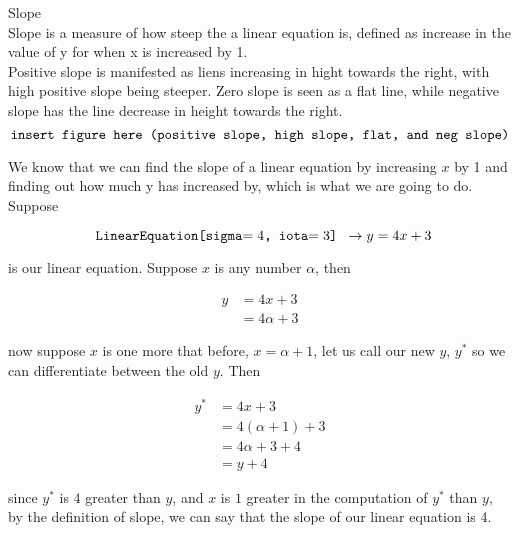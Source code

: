 \documentclass{book}
\begin{document}
  {\remark Slope \\
    Slope is a measure of how steep the a linear equation is, defined as increase in the value of y for when x is increased by 1.\\

    Positive slope is manifested as liens increasing in hight towards the right, with high positive slope being steeper. Zero slope is seen as a flat line, while negative slope has the line decrease in height towards the right.\\

    $$\text{\texttt{insert figure here (positive slope, high slope, flat, and neg slope)}}$$

    We know that we can find the slope of a linear equation by increasing $x$ by 1 and finding out how much y has increased by, which is what we are going to do. Suppose

    $$\text{\texttt{ LinearEquation[sigma$= {4}$, iota$= {3}$] }}\to y = {4}x + {3}$$

    is our linear equation. Suppose $x$ is any number $\alpha$, then

    \begin{align*}
      y & = 4x + 3\\
      & = 4 \alpha + 3
    \end{align*}

    now suppose $x$ is one more that before, $x = \alpha + 1$, let us call our new $y$, $y^*$ so we can differentiate between the old $y$. Then

    \begin{align*}
      y^* & = 4x + 3\\
      & = 4(\alpha + 1) + 3\\
      & = 4\alpha + 3 + 4\\
      & = y + 4
    \end{align*}

    since $y^*$ is $4$ greater than $y$, and $x$ is $1$ greater in the computation of $y^*$ than $y$, by the definition of slope, we can say that the slope of our linear equation is 4.\\
  }
\end{document}
